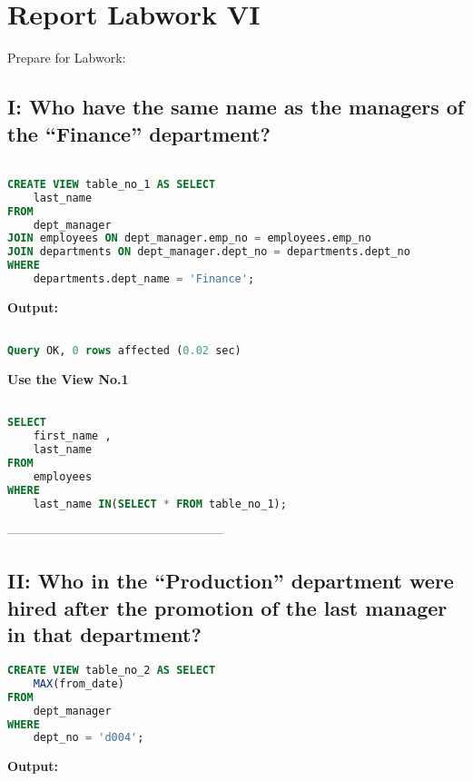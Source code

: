 \documentclass[12pt]{report}
\begin{document}
\section*{Report Labwork VI}

Prepare for Labwork:

{\small
{}}

\subsection*{I: Who have the same name as the managers of the “Finance” department?}

\begin{lstlisting}[language=sql]

CREATE VIEW table_no_1 AS SELECT
	last_name
FROM
	dept_manager
JOIN employees ON dept_manager.emp_no = employees.emp_no
JOIN departments ON dept_manager.dept_no = departments.dept_no
WHERE
	departments.dept_name = 'Finance';

\end{lstlisting}


\textbf{Output:}

\begin{lstlisting}[language=sql]

Query OK, 0 rows affected (0.02 sec)

\end{lstlisting}

\textbf{Use the View No.1}
\begin{lstlisting}[language=sql]

SELECT
	first_name ,
	last_name
FROM
	employees
WHERE
	last_name IN(SELECT * FROM table_no_1);

\end{lstlisting}


---------------------------------------------------


\subsection*{II: Who in the “Production” department were hired after the promotion of the last manager in that department?}

\begin{lstlisting}[language=sql]
CREATE VIEW table_no_2 AS SELECT
	MAX(from_date)
FROM
	dept_manager
WHERE
	dept_no = 'd004';
\end{lstlisting}


\textbf{Output:}
\end{document}
